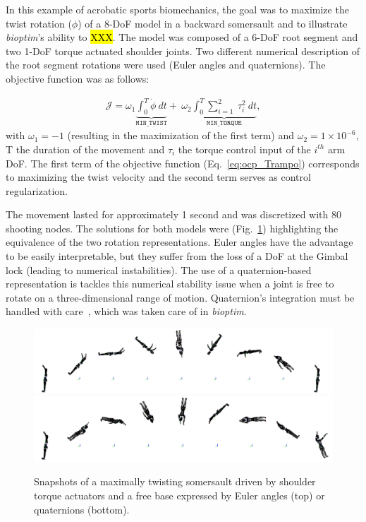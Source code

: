 In this example of acrobatic sports biomechanics, the goal was to maximize the twist rotation ($\phi$) of a 8-DoF model in a backward somersault and to illustrate \textit{bioptim}'s ability to \hl{XXX}.
The model was composed of a 6-DoF root segment and two 1-DoF torque actuated shoulder joints.
Two different numerical description of the root segment rotations were used (Euler angles and quaternions).
The objective function was as follows:

\begin{eqnarray}\label{eq:ocp_Trampo}
\mathcal{J} = \omega_1 \underbrace{\int_0^T \dot{\phi}~dt}_{\mathtt{MIN\_TWIST}}  +~\omega_2 \underbrace{\int_0^T \sum_{i=1}^{2}~\tau_{i}^2~dt}_{\mathtt{MIN\_ TORQUE}},
\end{eqnarray}
with $\omega_1 = -1$ (resulting in the maximization of the first term) and $\omega_2 = 1\times 10^{-6}$, T the duration of the movement and $\tau_{i}$ the torque control input of the $i^{th}$ arm DoF.
The first term of the objective function (Eq.~\ref{eq:ocp_Trampo}) corresponds to maximizing the twist velocity and the second term serves as control regularization.


The movement lasted for approximately 1 second and was discretized with 80 shooting nodes.
The solutions for both models were  (Fig.~\ref{fig:snapshots_quaternion_base_twisting_somersault}) highlighting the equivalence of the two rotation representations.
Euler angles have the advantage to be easily interpretable, but they suffer from the loss of a DoF at the Gimbal lock (leading to numerical instabilities).
The use of a quaternion-based representation is tackles this numerical stability issue when a joint is free to rotate on a three-dimensional range of motion.
Quaternion's integration must be handled with care~\cite{bailly2020optimal}, which was taken care of in \textit{bioptim}.


\begin{figure}[t!]
\centering
\includegraphics[width=\textwidth]{figures/Euler_Bioptim_MaxVrille_dos.png}\\
\vspace*{0.5em}
\includegraphics[width=\textwidth]{figures/Quat_Bioptim_MaxVrille_dos.png}
\caption{Snapshots of a maximally twisting somersault driven by shoulder torque actuators and a free base expressed by Euler angles (top) or quaternions (bottom).}
\label{fig:snapshots_quaternion_base_twisting_somersault}
\end{figure}


